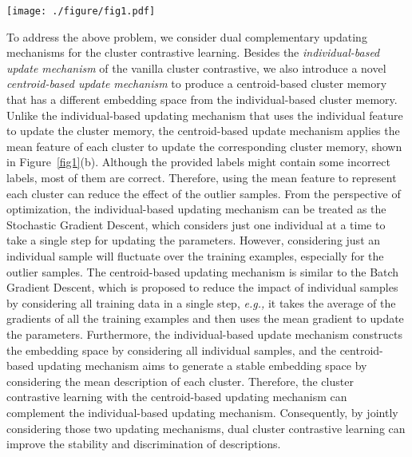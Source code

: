 \documentclass[10pt,twocolumn,letterpaper]{article}
\begin{document}
\begin{figure*}
  \centering
   \texttt{[image: ./figure/fig1.pdf]}
   \caption{\small Comparison with the Vallina Cluster Contrastive learning (a), and the Dual Cluster Contrastive Learning (b). Feature vectors in different shades of green are of the same identity.}
   \label{fig1}
\vspace{-1.0em}
\end{figure*}

To address the above problem, we consider dual complementary updating mechanisms for the cluster contrastive learning.
Besides the \emph{individual-based update mechanism} of the vanilla cluster contrastive, we also introduce a novel \emph{centroid-based update mechanism} to produce a centroid-based cluster memory that has a different embedding space from the individual-based cluster memory.
Unlike the individual-based updating mechanism that uses the individual feature to update the cluster memory, the centroid-based update mechanism applies the mean feature of each cluster to update the corresponding cluster memory, shown in Figure~\ref{fig1}(b).
Although the provided labels might contain some incorrect labels, most of them are correct.
Therefore, using the mean feature to represent each cluster can reduce the effect of the outlier samples.
From the perspective of optimization,  the individual-based updating mechanism can be treated as the Stochastic Gradient Descent, which considers just one individual at a time to take a single step for updating the parameters.
However, considering just an individual sample will fluctuate over the training examples, especially for the outlier samples.
The centroid-based updating mechanism is similar to the Batch Gradient Descent, which is proposed to reduce the impact of individual samples by considering all training data in a single step, \emph{e.g.,} it takes the average of the gradients of all the training examples and then uses the mean gradient to update the parameters.
Furthermore, the individual-based update mechanism constructs the embedding space by considering all individual samples, and the centroid-based updating mechanism aims to generate a stable embedding space by considering the mean description of each cluster.
Therefore, the cluster contrastive learning with the centroid-based updating mechanism can complement the individual-based updating mechanism.
Consequently, by jointly considering those two updating mechanisms, dual cluster contrastive learning can improve the stability and discrimination of descriptions.
\end{document}

